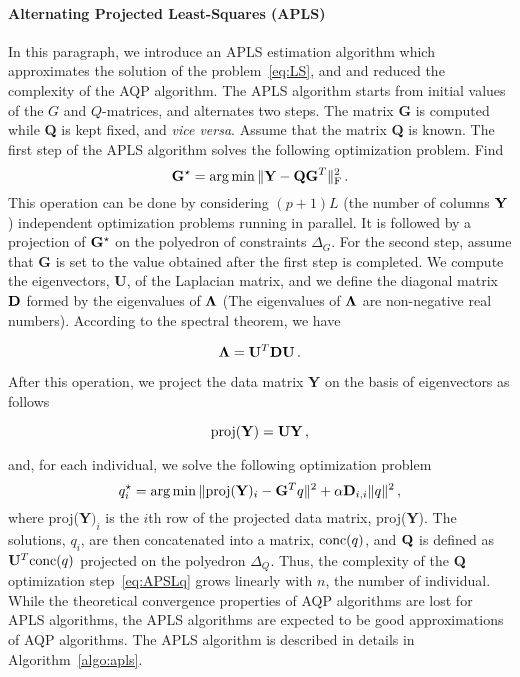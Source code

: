 \paragraph{Alternating Projected Least-Squares (APLS)} In this paragraph, we introduce an APLS estimation algorithm which approximates the solution of the problem~\eqref{eq:LS}, and and reduced the complexity of the AQP algorithm. The APLS algorithm starts from initial values of the $G$ and $Q$-matrices, and alternates two steps. The matrix {\bf G} is computed  while  {\bf Q} is kept fixed, and {\it vice versa}. Assume that the matrix {\bf Q} is known. The first step of the APLS algorithm solves the following optimization problem. Find 
\begin{equation}
{\bf G}^\star = \arg \min  \|  {\bf Y} - {\bf QG}^T \|^2_{\rm F} \, .
\end{equation}
This operation can be done by considering $(p+1)L$ (the number of columns ${\bf Y}$) independent optimization problems running in parallel. It is followed by a projection of ${\bf G}^\star$ on the polyedron of constraints $\Delta_G$. For the second step, assume that {\bf G} is set to the value obtained after the first step is completed. We compute the eigenvectors, {\bf U}, of the Laplacian matrix, and we define the diagonal matrix ${\bf D}$ formed by the eigenvalues of ${\bf \Lambda}$ (The eigenvalues of ${\bf \Lambda}$ are non-negative real numbers). According to the spectral theorem, we have

$$
{\bf \Lambda} = {\bf U}^T {\bf D} {\bf U} \, .
$$

\noindent  After this operation, we project the data matrix {\bf Y} on the basis of eigenvectors as follows

$$
{\rm proj} ({\bf Y}) = {\bf U}{\bf Y} \, , 
$$

\noindent and, for each individual, we solve the following optimization problem
\begin{equation}
q_i^\star = \arg \min  \|  {\rm proj} ({\bf Y})_i  - {\bf G}^Tq \|^2 + \alpha {\bf D}_{i,i}   \| q \|^2  \, ,
\label{eq:APSLq}
\end{equation}
\noindent where  proj({\bf Y}$)_i$ is the $i$th row of the projected data matrix, proj({\bf Y}). The solutions, $q_i$, are then concatenated into a matrix, ${\rm conc}(q)$, and ${\bf Q}$ is defined as ${\bf U}^T {\rm conc}(q)$ projected on the polyedron $\Delta_Q$. Thus, the complexity of the {\bf Q} optimization step~\eqref{eq:APSLq} grows linearly with $n$, the number of individual. While the theoretical convergence properties of AQP algorithms are lost for APLS algorithms, the APLS algorithms are expected to be good approximations of AQP algorithms. The APLS algorithm is described in details in Algorithm~\ref{algo:apls}.

